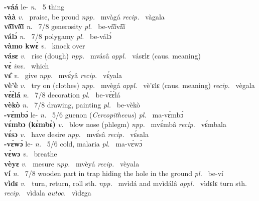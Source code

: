 \noindent 
{\bfseries -váá} le- {\itshape n.~} 5 thing    \\ 
{\bfseries vàà}  {\itshape v.~} praise, be proud   {\itshape npp.~} mvàgá {\itshape recip.~} vàgala  \\ 
{\bfseries vã́ĩ̀vã̀ĩ̀}  {\itshape n.~} 7/8 generosity {\itshape pl.~} be-vã́ĩ̀vã́ĩ̀    \\ 
{\bfseries válɔ́}  {\itshape n.~} 7/8 polygamy {\itshape pl.~} be-válɔ́    \\ 
{\bfseries vàmo kwɛ̀}  {\itshape v.~} knock over    \\ 
{\bfseries vásɛ}  {\itshape v.~} rise (dough)   {\itshape npp.~} mvásâ {\itshape appl.~} vásɛlɛ (caus. meaning)  \\ 
{\bfseries vɛ́}  {\itshape inv.~} which    \\ 
{\bfseries vɛ̂}  {\itshape v.~} give   {\itshape npp.~} mvɛ́yâ {\itshape recip.~} vɛ́yala  \\ 
{\bfseries vè'è}  {\itshape v.~} try on (clothes)   {\itshape npp.~} mvègá {\itshape appl.~} vè'ɛlɛ (caus. meaning) {\itshape recip.~} vègala  \\ 
{\bfseries vɛ́ɛ̀lá}  {\itshape n.~} 7/8 decoration {\itshape pl.~} be-vɛ́ɛ̀lá    \\ 
{\bfseries vèkò}  {\itshape n.~} 7/8 drawing, painting {\itshape pl.~} be-vèkò    \\ 
{\bfseries -vɛ́mbɔ́} le- {\itshape n.~} 5/6 guenon ({\itshape Cercopithecus}) {\itshape pl.~} ma-vɛ́mbɔ́    \\ 
{\bfseries vɛ́mbɔ (kɛ̀mbɛ̀)}  {\itshape v.~} blow nose (phlegm)   {\itshape npp.~} mvɛ́mbâ {\itshape recip.~} vɛ́mbala  \\ 
{\bfseries vɛ́sɔ}  {\itshape v.~} have desire   {\itshape npp.~} mvɛ́sâ {\itshape recip.~} vɛ́sala  \\ 
{\bfseries -vɛ́wɔ̀} le- {\itshape n.~} 5/6 cold, malaria {\itshape pl.~} ma-vɛ́wɔ̀   \\ 
{\bfseries vɛ̀wɔ}  {\itshape v.~} breathe    \\ 
{\bfseries vèyɛ}  {\itshape v.~} mesure   {\itshape npp.~} mvèyá {\itshape recip.~} vèyala  \\ 
{\bfseries ví}  {\itshape n.~} 7/8 wooden part in trap hiding the hole in the ground {\itshape pl.~} be-ví    \\ 
{\bfseries vìdɛ}  {\itshape v.~} turn, return, roll sth.   {\itshape npp.~} mvìdá and mvìdálâ {\itshape appl.~} vìdɛlɛ turn sth. {\itshape recip.~} vìdala {\itshape autoc.~} vìdɛga  \\ 
